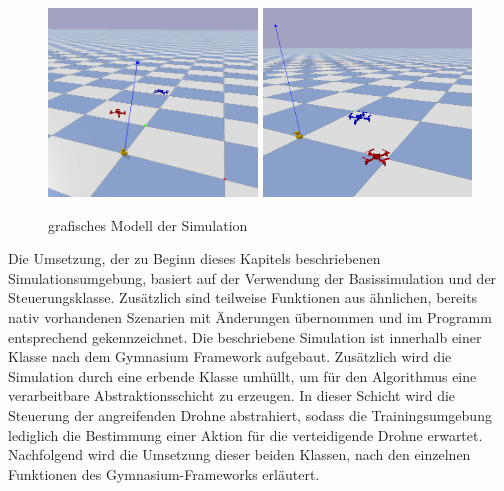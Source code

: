 \begin{figure}[htb]
    \centering
    \includegraphics[height=5cm]{lib/graphics/drone_sim.png}
    \includegraphics[height=5cm]{lib/graphics/drone_sim2.png}
    \caption[grafisches Modell der Simulation]{grafisches Modell der Simulation\footnotemark}
    \label{abb:simenv model}
\end{figure}


Die Umsetzung, der zu Beginn dieses Kapitels beschriebenen Simulationsumgebung, basiert auf der Verwendung der Basissimulation und der Steuerungsklasse.
Zusätzlich sind teilweise Funktionen aus ähnlichen, bereits nativ vorhandenen Szenarien mit Änderungen übernommen und im Programm entsprechend gekennzeichnet.
Die beschriebene Simulation ist innerhalb einer Klasse nach dem Gymnasium Framework aufgebaut.
Zusätzlich wird die Simulation durch eine erbende Klasse umhüllt, um für den Algorithmus eine verarbeitbare Abstraktionsschicht zu erzeugen.
In dieser Schicht wird die Steuerung der angreifenden Drohne abstrahiert, sodass die Trainingsumgebung lediglich die Bestimmung einer Aktion für die verteidigende Drohne erwartet.
Nachfolgend wird die Umsetzung dieser beiden Klassen, nach den einzelnen Funktionen des Gymnasium-Frameworks erläutert.

